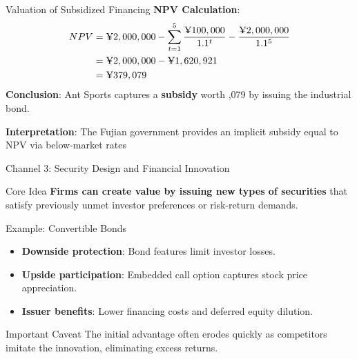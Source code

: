 \begin{frame}{Valuation of Subsidized Financing}
	\textbf{NPV Calculation}:
	\begin{align*}
		NPV &= \text{\textyen} 2,000,000 - \sum_{t=1}^5 \frac{\text{\textyen} 100,000}{1.1^t} - \frac{\text{\textyen} 2,000,000}{1.1^5} \\
		&= \text{\textyen} 2,000,000 - \text{\textyen} 1,620,921 \\
		&= \text{\textyen} 379,079
	\end{align*}
	\textbf{Conclusion}:  
	Ant Sports captures a \textbf{subsidy} worth ,079 by issuing the industrial bond.

 \textbf{Interpretation}: The Fujian government provides an implicit subsidy equal to NPV via below-market rates
\end{frame}

\begin{frame}{Channel 3: Security Design and Financial Innovation}
	\begin{block}{Core Idea}
		\textbf{Firms can create value by issuing new types of securities} that satisfy previously unmet investor preferences or risk-return demands.
	\end{block}
	
	\vspace{0.3cm}
	
	\begin{exampleblock}{Example: Convertible Bonds}
		\begin{itemize}
			\item \textbf{Downside protection}: Bond features limit investor losses.
			\item \textbf{Upside participation}: Embedded call option captures stock price appreciation.
			\item \textbf{Issuer benefits}: Lower financing costs and deferred equity dilution.
		\end{itemize}
	\end{exampleblock}
	
	\vspace{0.3cm}
	\begin{alertblock}{Important Caveat}
		The initial advantage often erodes quickly as competitors imitate the innovation, eliminating excess returns.
	\end{alertblock}
\end{frame}

